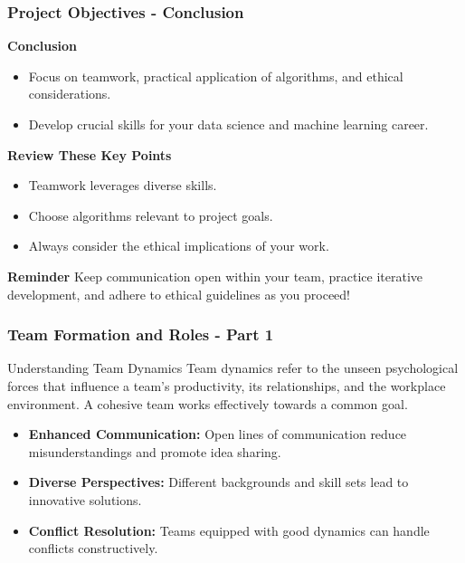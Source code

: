 \documentclass[aspectratio=169]{beamer}
\begin{document}
\begin{frame}[fragile]
    \frametitle{Project Objectives - Conclusion}
    \textbf{Conclusion}
    \begin{itemize}
        \item Focus on teamwork, practical application of algorithms, and ethical considerations.
        \item Develop crucial skills for your data science and machine learning career.
    \end{itemize}

    \textbf{Review These Key Points}
    \begin{itemize}
        \item Teamwork leverages diverse skills.
        \item Choose algorithms relevant to project goals.
        \item Always consider the ethical implications of your work.
    \end{itemize}

    \textbf{Reminder}
    Keep communication open within your team, practice iterative development, and adhere to ethical guidelines as you proceed!
\end{frame}

\begin{frame}[fragile]
    \frametitle{Team Formation and Roles - Part 1}
    
    \begin{block}{Understanding Team Dynamics}
        Team dynamics refer to the unseen psychological forces that influence a team's productivity, its relationships, and the workplace environment. A cohesive team works effectively towards a common goal.
    \end{block}
    
    \begin{itemize}
        \item \textbf{Enhanced Communication:} Open lines of communication reduce misunderstandings and promote idea sharing.
        \item \textbf{Diverse Perspectives:} Different backgrounds and skill sets lead to innovative solutions.
        \item \textbf{Conflict Resolution:} Teams equipped with good dynamics can handle conflicts constructively.
    \end{itemize}
\end{frame}
\end{document}
